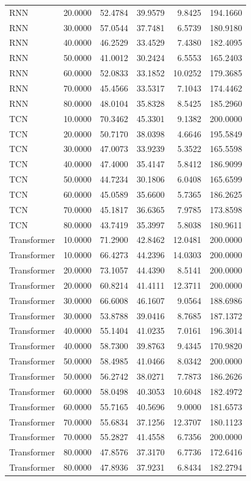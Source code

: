 \begin{tabular}{lrrrrr}
RNN & 20.0000 & 52.4784 & 39.9579 & 9.8425 & 194.1660 \\
RNN & 30.0000 & 57.0544 & 37.7481 & 6.5739 & 180.9180 \\
RNN & 40.0000 & 46.2529 & 33.4529 & 7.4380 & 182.4095 \\
RNN & 50.0000 & 41.0012 & 30.2424 & 6.5553 & 165.2403 \\
RNN & 60.0000 & 52.0833 & 33.1852 & 10.0252 & 179.3685 \\
RNN & 70.0000 & 45.4566 & 33.5317 & 7.1043 & 174.4462 \\
RNN & 80.0000 & 48.0104 & 35.8328 & 8.5425 & 185.2960 \\
TCN & 10.0000 & 70.3462 & 45.3301 & 9.1382 & 200.0000 \\
TCN & 20.0000 & 50.7170 & 38.0398 & 4.6646 & 195.5849 \\
TCN & 30.0000 & 47.0073 & 33.9239 & 5.3522 & 165.5598 \\
TCN & 40.0000 & 47.4000 & 35.4147 & 5.8412 & 186.9099 \\
TCN & 50.0000 & 44.7234 & 30.1806 & 6.0408 & 165.6599 \\
TCN & 60.0000 & 45.0589 & 35.6600 & 5.7365 & 186.2625 \\
TCN & 70.0000 & 45.1817 & 36.6365 & 7.9785 & 173.8598 \\
TCN & 80.0000 & 43.7419 & 35.3997 & 5.8038 & 180.9611 \\
Transformer & 10.0000 & 71.2900 & 42.8462 & 12.0481 & 200.0000 \\
Transformer & 10.0000 & 66.4273 & 44.2396 & 14.0303 & 200.0000 \\
Transformer & 20.0000 & 73.1057 & 44.4390 & 8.5141 & 200.0000 \\
Transformer & 20.0000 & 60.8214 & 41.4111 & 12.3711 & 200.0000 \\
Transformer & 30.0000 & 66.6008 & 46.1607 & 9.0564 & 188.6986 \\
Transformer & 30.0000 & 53.8788 & 39.0416 & 8.7685 & 187.1372 \\
Transformer & 40.0000 & 55.1404 & 41.0235 & 7.0161 & 196.3014 \\
Transformer & 40.0000 & 58.7300 & 39.8763 & 9.4345 & 170.9820 \\
Transformer & 50.0000 & 58.4985 & 41.0466 & 8.0342 & 200.0000 \\
Transformer & 50.0000 & 56.2742 & 38.0271 & 7.7873 & 186.2626 \\
Transformer & 60.0000 & 58.0498 & 40.3053 & 10.6048 & 182.4972 \\
Transformer & 60.0000 & 55.7165 & 40.5696 & 9.0000 & 181.6573 \\
Transformer & 70.0000 & 55.6834 & 37.1256 & 12.3707 & 180.1123 \\
Transformer & 70.0000 & 55.2827 & 41.4558 & 6.7356 & 200.0000 \\
Transformer & 80.0000 & 47.8576 & 37.3170 & 6.7736 & 172.6416 \\
Transformer & 80.0000 & 47.8936 & 37.9231 & 6.8434 & 182.2794 \\
\bottomrule
\end{tabular}
